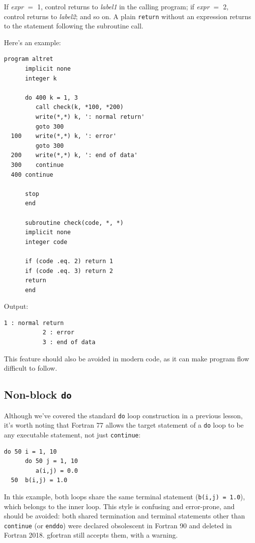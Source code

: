 If \emph{expr} $=$ 1, control returns to \emph{label1} in the calling program; if \emph{expr} $=$ 2, control returns to \emph{label2}; and so on. A plain \texttt{return} without an expression returns to the statement following the subroutine call.

Here's an example:

\begin{lstlisting}[style=fortran77]
      program altret
      implicit none
      integer k

      do 400 k = 1, 3
         call check(k, *100, *200)
         write(*,*) k, ': normal return'
         goto 300
  100    write(*,*) k, ': error'
         goto 300
  200    write(*,*) k, ': end of data'
  300    continue
  400 continue

      stop
      end

      subroutine check(code, *, *)
      implicit none
      integer code

      if (code .eq. 2) return 1
      if (code .eq. 3) return 2
      return
      end
\end{lstlisting}

Output:

\begin{lstlisting}[style=output]
           1 : normal return
           2 : error
           3 : end of data
\end{lstlisting}

This feature should also be avoided in modern code, as it can make program flow difficult to follow.

\subsection{Non-block \texttt{do}}

Although we've covered the standard \texttt{do} loop construction in a previous lesson, it's worth noting that Fortran 77 allows the target statement of a \texttt{do} loop to be any executable statement, not just \texttt{continue}:

\begin{lstlisting}[style=fortran77]
      do 50 i = 1, 10
      do 50 j = 1, 10
         a(i,j) = 0.0
  50  b(i,j) = 1.0
\end{lstlisting}

In this example, both loops share the same terminal statement (\texttt{b(i,j) = 1.0}), which belongs to the inner loop. This style is confusing and error-prone, and should be avoided: both shared termination and terminal statements other than \texttt{continue} (or \texttt{enddo}) were declared obsolescent in Fortran 90 and deleted in Fortran 2018. gfortran still accepts them, with a warning.

